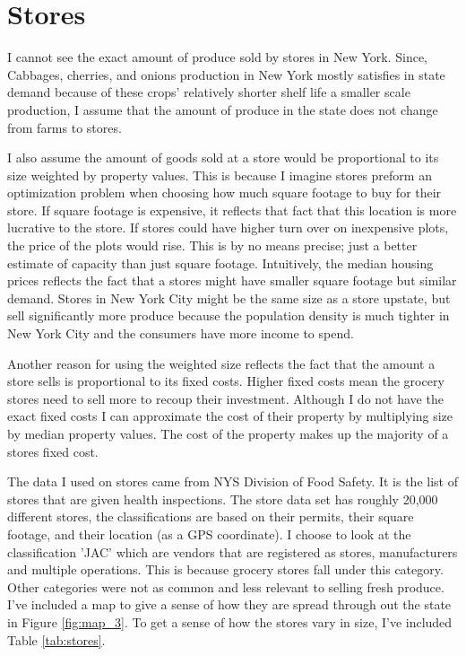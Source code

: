 \documentclass{report}
\begin{document}
\section{Stores}

I cannot see the exact amount of produce sold by stores in New York. Since, Cabbages, cherries, and onions production in New York mostly satisfies in state demand because of these crops' relatively shorter shelf life a smaller scale production, I assume that the amount of produce in the state does not change from farms to stores. 

I also assume the amount of goods sold at a store would be proportional to its size weighted by property values. This is because I imagine stores preform an optimization problem when choosing how much square footage to buy for their store. If square footage is expensive, it reflects that fact that this location is more lucrative to the store. If stores could have higher turn over on inexpensive plots, the price of the plots would rise. This is by no means precise; just a better estimate of capacity than just square footage. Intuitively, the median housing prices reflects the fact that a stores might have smaller square footage but similar demand. Stores in New York City might be the same size as a store upstate, but sell significantly more produce because the population density is much tighter in New York City and the consumers have more income to spend.  

Another reason for using the weighted size reflects the fact that the amount a store sells is proportional to its fixed costs. Higher fixed costs mean the grocery stores need to sell more to recoup their investment. Although I do not have the exact fixed costs I can approximate the cost of their property by multiplying size by median property values. The cost of the property makes up the majority of a stores fixed cost.

The data I used on stores came from NYS Division of Food Safety. It is the list of stores that are given health inspections. The store data set has roughly 20,000 different stores, the classifications are based on their permits, their square footage, and their location (as a GPS coordinate). I choose to look at the classification 'JAC' which are vendors that are registered as stores, manufacturers and multiple operations. This is because grocery stores fall under this category. Other categories were not as common and less relevant to selling fresh produce. I've included a map to give a sense of how they are spread through out the state in Figure \ref{fig:map_3}. To get a sense of how the stores vary in size, I've included Table \ref{tab:stores}.
\end{document}
